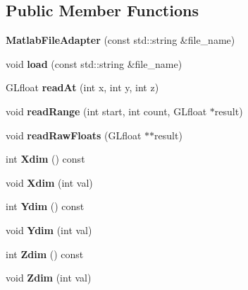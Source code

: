 \subsection*{Public Member Functions}
\begin{DoxyCompactItemize}
\item 
{\bfseries Matlab\-File\-Adapter} (const std\-::string \&file\-\_\-name)\label{classSoundfieldViewer_1_1MatlabFileAdapter_a6ef507996b091726e8d963f6cf4e9c54}

\item 
void {\bfseries load} (const std\-::string \&file\-\_\-name)\label{classSoundfieldViewer_1_1MatlabFileAdapter_a6a686efa3d63e4d72a9c2c1631c552b9}

\item 
G\-Lfloat {\bfseries read\-At} (int x, int y, int z)\label{classSoundfieldViewer_1_1MatlabFileAdapter_abbf88223ed3a94de478c10b8141f7d66}

\item 
void {\bfseries read\-Range} (int start, int count, G\-Lfloat $\ast$result)\label{classSoundfieldViewer_1_1MatlabFileAdapter_a4e303c30723bc0615c031d3ac1363999}

\item 
void {\bfseries read\-Raw\-Floats} (G\-Lfloat $\ast$$\ast$result)\label{classSoundfieldViewer_1_1MatlabFileAdapter_a3805ce7e645335a7dbcf562dfed7312c}

\item 
int {\bfseries Xdim} () const \label{classSoundfieldViewer_1_1MatlabFileAdapter_a40012df29f830e77eddd29bb0bd482db}

\item 
void {\bfseries Xdim} (int val)\label{classSoundfieldViewer_1_1MatlabFileAdapter_a2be3a6dadaedc63c1c53e4559db172ad}

\item 
int {\bfseries Ydim} () const \label{classSoundfieldViewer_1_1MatlabFileAdapter_a84dd95fc383510d9e9db4e4f80f182a5}

\item 
void {\bfseries Ydim} (int val)\label{classSoundfieldViewer_1_1MatlabFileAdapter_a5c023d543219a95222cb37ba641440cf}

\item 
int {\bfseries Zdim} () const \label{classSoundfieldViewer_1_1MatlabFileAdapter_a10d8ede726d591aada18cc4784bf6128}

\item 
void {\bfseries Zdim} (int val)\label{classSoundfieldViewer_1_1MatlabFileAdapter_ac8de8a3dfe1ddf6c7d61ba7ded19acc7}

\end{DoxyCompactItemize}
